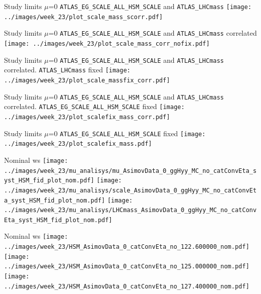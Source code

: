 \documentclass[10pt,UKenglish, leqno, xcolor = dvipsnames]{beamer}
\begin{document}
		\begin{frame}{Study limits $\mu$=0}
			\vfill
			\texttt{ATLAS\_EG\_SCALE\_ALL\_HSM\_SCALE} and \texttt{ATLAS\_LHCmass}
			\centering
			\texttt{[image: ../images/week\_23/plot\_scale\_mass\_scorr.pdf]}
			\vfill
		\end{frame}
	
		\begin{frame}{Study limits $\mu$=0}
			\vfill
			\texttt{ATLAS\_EG\_SCALE\_ALL\_HSM\_SCALE} and \texttt{ATLAS\_LHCmass} correlated
			\centering
			\texttt{[image: ../images/week\_23/plot\_scale\_mass\_corr\_nofix.pdf]}
			\vfill
		\end{frame}
	
		\begin{frame}{Study limits $\mu$=0}
			\vfill
			\texttt{ATLAS\_EG\_SCALE\_ALL\_HSM\_SCALE} and \texttt{ATLAS\_LHCmass} correlated. \texttt{ATLAS\_LHCmass} fixed
			\centering
			\texttt{[image: ../images/week\_23/plot\_scale\_massfix\_corr.pdf]}
			\vfill
		\end{frame}
		
		\begin{frame}{Study limits $\mu$=0}
			\vfill
			\texttt{ATLAS\_EG\_SCALE\_ALL\_HSM\_SCALE} and \texttt{ATLAS\_LHCmass} correlated. \texttt{ATLAS\_EG\_SCALE\_ALL\_HSM\_SCALE} fixed
			\centering
			\texttt{[image: ../images/week\_23/plot\_scalefix\_mass\_corr.pdf]}
			\vfill
		\end{frame}
	
		\begin{frame}{Study limits $\mu$=0}
			\vfill
			\texttt{ATLAS\_EG\_SCALE\_ALL\_HSM\_SCALE} fixed
			\centering
			\texttt{[image: ../images/week\_23/plot\_scalefix\_mass.pdf]}
			\vfill
		\end{frame}
	
		\begin{frame}{Nominal ws}
			\vfill
			\centering
			\texttt{[image: ../images/week\_23/mu\_analisys/mu\_AsimovData\_0\_ggHyy\_MC\_no\_catConvEta\_syst\_HSM\_fid\_plot\_nom.pdf]}
			\texttt{[image: ../images/week\_23/mu\_analisys/scale\_AsimovData\_0\_ggHyy\_MC\_no\_catConvEta\_syst\_HSM\_fid\_plot\_nom.pdf]}
			\texttt{[image: ../images/week\_23/mu\_analisys/LHCmass\_AsimovData\_0\_ggHyy\_MC\_no\_catConvEta\_syst\_HSM\_fid\_plot\_nom.pdf]}
			\vfill
		\end{frame}
	
		\begin{frame}{Nominal ws}
			\vfill
			\centering
			\texttt{[image: ../images/week\_23/HSM\_AsimovData\_0\_catConvEta\_no\_122.600000\_nom.pdf]}
			\texttt{[image: ../images/week\_23/HSM\_AsimovData\_0\_catConvEta\_no\_125.000000\_nom.pdf]}
			\texttt{[image: ../images/week\_23/HSM\_AsimovData\_0\_catConvEta\_no\_127.400000\_nom.pdf]}
			\vfill
		\end{frame}
	
\end{document}
